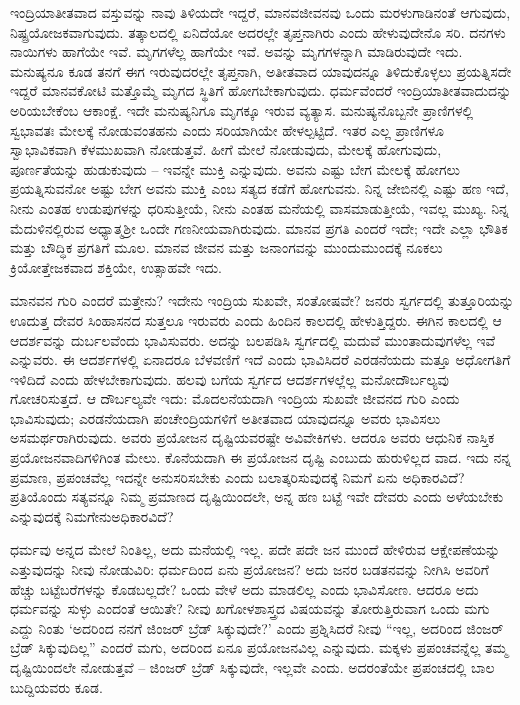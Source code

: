 ಇಂದ್ರಿಯಾತೀತವಾದ ವಸ್ತುವನ್ನು ನಾವು ತಿಳಿಯದೇ ಇದ್ದರೆ, ಮಾನವ\break ಜೀವನವು ಒಂದು ಮರಳುಗಾಡಿನಂತೆ ಆಗುವುದು, ನಿಷ್ಪ್ರಯೋಜಕವಾಗುವುದು. ತತ್ಕಾಲದಲ್ಲಿ ಏನಿದೆಯೋ ಅದರಲ್ಲೇ ತೃಪ್ತನಾಗಿರು ಎಂದು ಹೇಳುವುದೇನೊ ಸರಿ. ದನಗಳು ನಾಯಿಗಳು ಹಾಗೆಯೇ ಇವೆ. ಮೃಗಗಳೆಲ್ಲ ಹಾಗೆಯೇ ಇವೆ. ಅವನ್ನು ಮೃಗಗಳನ್ನಾಗಿ ಮಾಡಿರುವುದೇ ಇದು. ಮನುಷ್ಯನೂ ಕೂಡ ತನಗೆ ಈಗ ಇರುವುದರಲ್ಲೇ ತೃಪ್ತನಾಗಿ, ಅತೀತವಾದ ಯಾವುದನ್ನೂ ತಿಳಿದುಕೊಳ್ಳಲು ಪ್ರಯತ್ನಿಸದೇ ಇದ್ದರೆ ಮಾನವಕೋಟಿ ಮತ್ತೊಮ್ಮೆ ಮೃಗದ ಸ್ಥಿತಿಗೆ ಹೋಗಬೇಕಾಗುವುದು. ಧರ್ಮವೆಂದರೆ ಇಂದ್ರಿಯಾತೀತವಾದುದನ್ನು ಅರಿಯಬೇಕೆಂಬ ಆಕಾಂಕ್ಷೆ. ಇದೇ ಮನುಷ್ಯನಿಗೂ ಮೃಗಕ್ಕೂ ಇರುವ ವ್ಯತ್ಯಾಸ. ಮನುಷ್ಯನೊಬ್ಬನೇ ಪ್ರಾಣಿಗಳಲ್ಲಿ ಸ್ವಭಾವತಃ ಮೇಲಕ್ಕೆ ನೋಡುವಂತಹನು ಎಂದು ಸರಿಯಾಗಿಯೇ ಹೇಳಲ್ಪಟ್ಟಿದೆ. ಇತರ ಎಲ್ಲ ಪ್ರಾಣಿಗಳೂ ಸ್ವಾಭಾವಿಕವಾಗಿ ಕೆಳಮುಖವಾಗಿ ನೋಡುತ್ತವೆ. ಹೀಗೆ ಮೇಲೆ ನೋಡುವುದು, ಮೇಲಕ್ಕೆ ಹೋಗುವುದು, ಪೂರ್ಣತೆಯನ್ನು ಹುಡುಕುವುದು – ಇವನ್ನೇ ಮುಕ್ತಿ ಎನ್ನುವುದು. ಅವನು ಎಷ್ಟು ಬೇಗ ಮೇಲಕ್ಕೆ ಹೋಗಲು ಪ್ರಯತ್ನಿಸುವನೋ ಅಷ್ಟು ಬೇಗ ಅವನು ಮುಕ್ತಿ ಎಂಬ ಸತ್ಯದ ಕಡೆಗೆ ಹೋಗುವನು. ನಿನ್ನ ಜೇಬಿನಲ್ಲಿ ಎಷ್ಟು ಹಣ ಇದೆ, ನೀನು ಎಂತಹ ಉಡುಪುಗಳನ್ನು ಧರಿಸುತ್ತೀಯೆ, ನೀನು ಎಂತಹ ಮನೆಯಲ್ಲಿ ವಾಸಮಾಡುತ್ತೀಯೆ, ಇವಲ್ಲ ಮುಖ್ಯ. ನಿನ್ನ ಮೆದುಳಿನಲ್ಲಿರುವ ಅಧ್ಯಾತ್ಮಶ‍್ರೀ ಒಂದೇ ಗಣನೀಯವಾಗಿರುವುದು. ಮಾನವ ಪ್ರಗತಿ ಎಂದರೆ ಇದೇ; ಇದೇ ಎಲ್ಲಾ ಭೌತಿಕ ಮತ್ತು ಬೌದ್ಧಿಕ ಪ್ರಗತಿಗೆ ಮೂಲ. ಮಾನವ ಜೀವನ ಮತ್ತು ಜನಾಂಗವನ್ನು ಮುಂದುಮುಂದಕ್ಕೆ ನೂಕಲು ಕ್ರಿಯೋತ್ತೇಜಕವಾದ ಶಕ್ತಿಯೇ, ಉತ್ಸಾಹವೇ ಇದು.

ಮಾನವನ ಗುರಿ ಎಂದರೆ ಮತ್ತೇನು? ಇದೇನು ಇಂದ್ರಿಯ ಸುಖವೇ, ಸಂತೋಷವೇ? ಜನರು ಸ್ವರ್ಗದಲ್ಲಿ ತುತ್ತೂರಿಯನ್ನು ಊದುತ್ತ ದೇವರ ಸಿಂಹಾಸನದ ಸುತ್ತಲೂ ಇರುವರು ಎಂದು ಹಿಂದಿನ ಕಾಲದಲ್ಲಿ ಹೇಳುತ್ತಿದ್ದರು. ಈಗಿನ ಕಾಲದಲ್ಲಿ ಆ ಆದರ್ಶವನ್ನು ದುರ್ಬಲವೆಂದು ಭಾವಿಸುವರು. ಅದನ್ನು ಬಲಪಡಿಸಿ ಸ್ವರ್ಗದಲ್ಲಿ ಮದುವೆ ಮುಂತಾದುವುಗಳೆಲ್ಲ ಇವೆ ಎನ್ನುವರು. ಈ ಆದರ್ಶಗಳಲ್ಲಿ ಏನಾದರೂ ಬೆಳವಣಿಗೆ ಇದೆ ಎಂದು ಭಾವಿಸಿದರೆ ಎರಡನೆಯದು ಮತ್ತೂ ಅಧೋಗತಿಗೆ ಇಳಿದಿದೆ ಎಂದು ಹೇಳಬೇಕಾಗುವುದು. ಹಲವು ಬಗೆಯ ಸ್ವರ್ಗದ ಆದರ್ಶಗಳಲ್ಲೆಲ್ಲ ಮನೋದೌರ್ಬಲ್ಯವು ಗೋಚರಿಸುತ್ತದೆ. ಆ ದೌರ್ಬಲ್ಯವೇ ಇದು: ಮೊದಲನೆಯದಾಗಿ ಇಂದ್ರಿಯ ಸುಖವೇ ಜೀವನದ ಗುರಿ ಎಂದು ಭಾವಿಸುವುದು; ಎರಡನೆಯದಾಗಿ ಪಂಚೇಂದ್ರಿಯಗಳಿಗೆ ಅತೀತವಾದ ಯಾವುದನ್ನೂ ಅವರು ಭಾವಿಸಲು ಅಸಮರ್ಥರಾಗಿರುವುದು. ಅವರು ಪ್ರಯೋಜನ ದೃಷ್ಟಿಯವರಷ್ಟೇ ಅವಿವೇಕಿಗಳು. ಆದರೂ ಅವರು ಆಧುನಿಕ ನಾಸ್ತಿಕ ಪ್ರಯೋಜನವಾದಿಗಳಿಗಿಂತ ಮೇಲು. ಕೊನೆಯದಾಗಿ ಈ ಪ್ರಯೋಜನ ದೃಷ್ಟಿ ಎಂಬುದು ಹುರುಳಿಲ್ಲದ ವಾದ. ಇದು ನನ್ನ ಪ್ರಮಾಣ, ಪ್ರಪಂಚವೆಲ್ಲ ಇದನ್ನೇ ಅನುಸರಿಸಬೇಕು ಎಂದು ಬಲಾತ್ಕರಿಸುವುದಕ್ಕೆ ನಿಮಗೆ ಏನು ಅಧಿಕಾರವಿದೆ? ಪ್ರತಿಯೊಂದು ಸತ್ಯವನ್ನೂ ನಿಮ್ಮ ಪ್ರಮಾಣದ ದೃಷ್ಟಿಯಿಂದಲೇ, ಅನ್ನ ಹಣ ಬಟ್ಟೆ ಇವೇ ದೇವರು ಎಂದು ಅಳೆಯಬೇಕು ಎನ್ನುವುದಕ್ಕೆ ನಿಮಗೇನು\break ಅಧಿಕಾರವಿದೆ?

\vskip 2pt

ಧರ್ಮವು ಅನ್ನದ ಮೇಲೆ ನಿಂತಿಲ್ಲ, ಅದು ಮನೆಯಲ್ಲಿ ಇಲ್ಲ. ಪದೇ ಪದೇ ಜನ ಮುಂದೆ ಹೇಳಿರುವ ಆಕ್ಷೇಪಣೆಯನ್ನು ಎತ್ತುವುದನ್ನು ನೀವು ನೋಡುವಿರಿ: ಧರ್ಮದಿಂದ ಏನು ಪ್ರಯೋಜನ? ಅದು ಜನರ ಬಡತನವನ್ನು ನೀಗಿಸಿ ಅವರಿಗೆ ಹೆಚ್ಚು ಬಟ್ಟೆಬರೆಗಳನ್ನು ಕೊಡಬಲ್ಲದೇ? ಒಂದು ವೇಳೆ ಅದು ಮಾಡಲಿಲ್ಲ ಎಂದು ಭಾವಿಸೋಣ. ಆದರೂ ಅದು ಧರ್ಮವನ್ನು ಸುಳ್ಳು ಎಂದಂತೆ ಆಯಿತೇ? ನೀವು ಖಗೋಳಶಾಸ್ತ್ರದ ವಿಷಯವನ್ನು ತೋರುತ್ತಿರುವಾಗ ಒಂದು ಮಗು ಎದ್ದು ನಿಂತು `ಅದರಿಂದ ನನಗೆ ಜಿಂಜರ್ ಬ್ರೆಡ್ ಸಿಕ್ಕುವುದೇ?' ಎಂದು ಪ್ರಶ್ನಿಸಿದರೆ ನೀವು “ಇಲ್ಲ, ಅದರಿಂದ ಜಿಂಜರ್ ಬ್ರೆಡ್ ಸಿಕ್ಕುವುದಿಲ್ಲ” ಎಂದರೆ ಮಗು, ಅದರಿಂದ ಏನೂ ಪ್ರಯೋಜನವಿಲ್ಲ ಎನ್ನುವುದು. ಮಕ್ಕಳು ಪ್ರಪಂಚವನ್ನೆಲ್ಲ ತಮ್ಮ ದೃಷ್ಟಿಯಿಂದಲೇ ನೋಡುತ್ತವೆ – ಜಿಂಜರ್ ಬ್ರೆಡ್ ಸಿಕ್ಕುವುದೇ, ಇಲ್ಲವೇ ಎಂದು. ಅದರಂತೆಯೇ ಪ್ರಪಂಚದಲ್ಲಿ ಬಾಲ ಬುದ್ದಿಯವರು ಕೂಡ.

